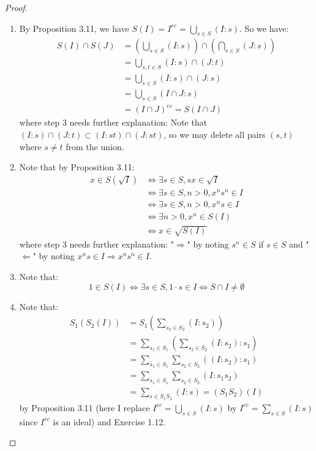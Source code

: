 \documentclass{solution}
\begin{document}
\begin{proof}
    \begin{enumerate}
        \item By Proposition 3.11, we have $S(I) = I^{ec} = \bigcup\limits_{s \in S}(I : s)$. So we have:
        $$
            \begin{aligned}
            S(I) \cap S(J) &= \left(\bigcup\limits_{s \in S} (I : s)\right) \cap \left(\bigcap\limits_{s \in S} (J : s)\right) \\
            &= \bigcup\limits_{s, t \in S} (I : s) \cap (J : t) \\
            &= \bigcup\limits_{s \in S} (I : s) \cap (J : s) \\
            &= \bigcup\limits_{s \in S} (I \cap J : s) \\
            &= (I \cap J)^{ec} = S(I \cap J)
            \end{aligned}
        $$
        where step 3 needs further explanation: Note that $(I : s) \cap (J : t) \subset (I : st) \cap (J : st)$, so we may delete all pairs $(s, t)$ where $s \ne t$ from the union.
        \item Note that by Proposition 3.11:
        $$
            \begin{aligned}
            x \in S(\sqrt{I}) &\Leftrightarrow \exists s \in S, sx \in \sqrt{I} \\
            &\Leftrightarrow \exists s \in S, n \gt 0, x^ns^n \in I \\
            &\Leftrightarrow \exists s \in S, n \gt 0, x^ns \in I \\
            &\Leftrightarrow \exists n \gt 0, x^n \in S(I) \\
            &\Leftrightarrow x \in \sqrt{S(I)}
            \end{aligned}
        $$
        where step 3 needs further explanation: "$\Rightarrow$" by noting $s^n \in S$ if $s \in S$ and "$\Leftarrow$" by noting $x^ns \in I \Rightarrow x^n s^n \in I$.
        \item Note that:
        $$1 \in S(I) \Leftrightarrow \exists s \in S, 1 \cdot s \in I \Leftrightarrow S \cap I \ne \emptyset$$
        \item Note that:
        $$
            \begin{aligned}
                S_1(S_2(I)) &= S_1 \left(\sum\limits_{s_2 \in S_2} (I : s_2)\right) \\
                &= \sum\limits_{s_1 \in S_1} \left(\sum\limits_{s_2 \in S_2} (I : s_2) : s_1\right) \\
                &= \sum\limits_{s_1 \in S_1} \sum\limits_{s_2 \in S_2} \left((I : s_2) : s_1\right) \\
                &= \sum\limits_{s_1 \in S_1} \sum\limits_{s_2 \in S_2} \left(I : s_1s_2\right) \\
                &= \sum\limits_{s \in S_1S_2} \left(I : s\right) = (S_1S_2)(I)
            \end{aligned}
        $$
        by Proposition 3.11 (here I replace $I^{ec} = \bigcup\limits_{s \in S}(I : s)$ by $I^{ec} = \sum\limits_{s \in S}(I : s)$ since $I^{ec}$ is an ideal) and Exercise 1.12.
    \end{enumerate}


\end{proof}
\end{document}
